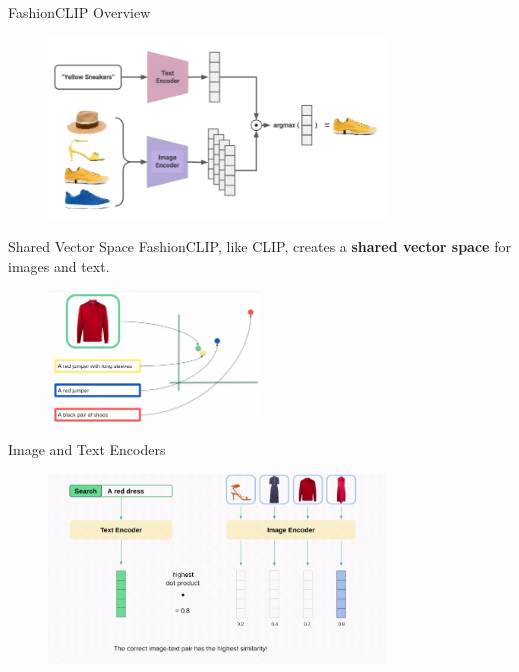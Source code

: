   \begin{frame}{FashionCLIP Overview}

  \begin{figure}[H]
      \centering
      \includegraphics[width=0.8\textwidth]{images/fashion-clip.png}
  \end{figure}
  \end{frame}

  \begin{frame}{Shared Vector Space}
  FashionCLIP, like CLIP, creates a \textbf{shared vector space} for images and text.

  \vspace{0.5em}

  \begin{figure}[H]
      \centering
      \includegraphics[width=0.5\textwidth]{../report_final/images/shared-vs.png}
  \end{figure}
  \end{frame}

  \begin{frame}{Image and Text Encoders}

  \begin{figure}[H]
      \centering
      \includegraphics[width=0.8\textwidth]{../report_final/images/dotprod.png}
  \end{figure}
  \end{frame}

